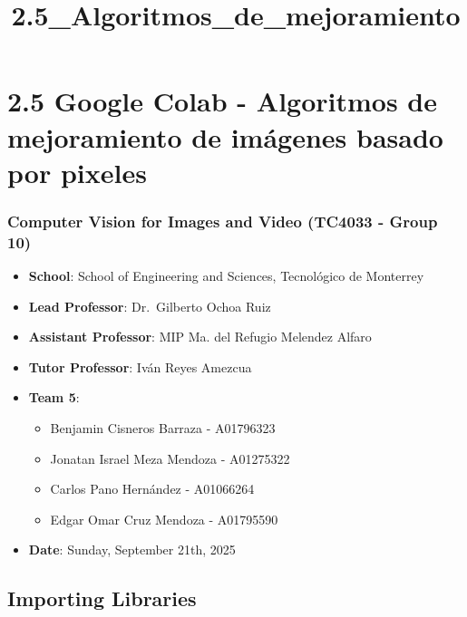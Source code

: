 \documentclass[11pt]{article}
\title{2.5\_Algoritmos\_de\_mejoramiento}
\providecommand{\tightlist}{%
      \setlength{\itemsep}{0pt}\setlength{\parskip}{0pt}}
\begin{document}
    
    \maketitle
    
    

    
    \hypertarget{google-colab---algoritmos-de-mejoramiento-de-imuxe1genes-basado-por-pixeles}{%
\section{2.5 Google Colab - Algoritmos de mejoramiento de imágenes
basado por
pixeles}\label{google-colab---algoritmos-de-mejoramiento-de-imuxe1genes-basado-por-pixeles}}

\hypertarget{computer-vision-for-images-and-video-tc4033---group-10}{%
\subsubsection{Computer Vision for Images and Video (TC4033 - Group
10)}\label{computer-vision-for-images-and-video-tc4033---group-10}}

\begin{itemize}
\tightlist
\item
  \textbf{School}: School of Engineering and Sciences, Tecnológico de
  Monterrey
\item
  \textbf{Lead Professor}: Dr.~Gilberto Ochoa Ruiz
\item
  \textbf{Assistant Professor}: MIP Ma. del Refugio Melendez Alfaro
\item
  \textbf{Tutor Professor}: Iván Reyes Amezcua
\item
  \textbf{Team 5}:

  \begin{itemize}
  \tightlist
  \item
    Benjamin Cisneros Barraza - A01796323
  \item
    Jonatan Israel Meza Mendoza - A01275322
  \item
    Carlos Pano Hernández - A01066264
  \item
    Edgar Omar Cruz Mendoza - A01795590
  \end{itemize}
\item
  \textbf{Date}: Sunday, September 21th, 2025
\end{itemize}

    \hypertarget{importing-libraries}{%
\subsection{\texorpdfstring{Importing Libraries
}{Importing Libraries }}\label{importing-libraries}}
\end{document}
